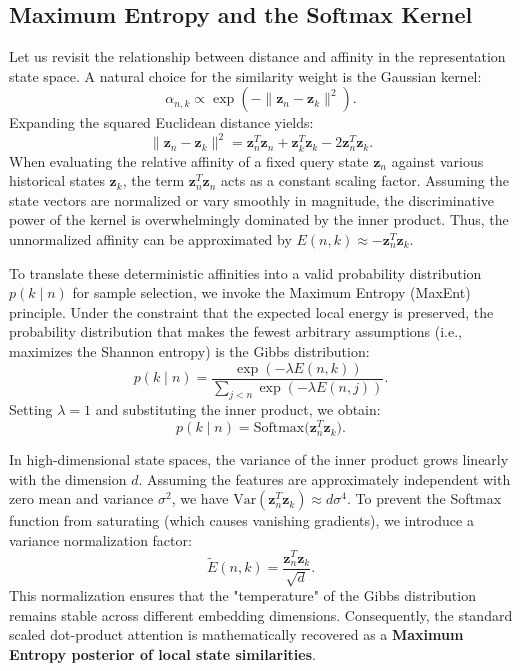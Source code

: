 \documentclass[conference]{IEEEtran}
\begin{document}
\subsection{Maximum Entropy and the Softmax Kernel}
Let us revisit the relationship between distance and affinity in the representation state space. A natural choice for the similarity weight is the Gaussian kernel:
\begin{equation}
\alpha_{n,k} \propto \exp(-\|\mathbf{z}_n - \mathbf{z}_k\|^2).
\end{equation}
Expanding the squared Euclidean distance yields:
\begin{equation}
\|\mathbf{z}_n - \mathbf{z}_k\|^2 = \mathbf{z}_n^T \mathbf{z}_n + \mathbf{z}_k^T \mathbf{z}_k - 2\mathbf{z}_n^T \mathbf{z}_k.
\end{equation}
When evaluating the relative affinity of a fixed query state $\mathbf{z}_n$ against various historical states $\mathbf{z}_k$, the term $\mathbf{z}_n^T \mathbf{z}_n$ acts as a constant scaling factor. Assuming the state vectors are normalized or vary smoothly in magnitude, the discriminative power of the kernel is overwhelmingly dominated by the inner product. Thus, the unnormalized affinity can be approximated by $E(n,k) \approx -\mathbf{z}_n^T \mathbf{z}_k$.

To translate these deterministic affinities into a valid probability distribution $p(k \mid n)$ for sample selection, we invoke the Maximum Entropy (MaxEnt) principle. Under the constraint that the expected local energy is preserved, the probability distribution that makes the fewest arbitrary assumptions (i.e., maximizes the Shannon entropy) is the Gibbs distribution:
\begin{equation}
p(k \mid n) = \frac{\exp(-\lambda E(n,k))}{\sum_{j<n}\exp(-\lambda E(n,j))}.
\end{equation}
Setting $\lambda = 1$ and substituting the inner product, we obtain:
\begin{equation}
p(k \mid n) = \text{Softmax}\big(\mathbf{z}_n^T \mathbf{z}_k\big).
\end{equation}

In high-dimensional state spaces, the variance of the inner product grows linearly with the dimension $d$. Assuming the features are approximately independent with zero mean and variance $\sigma^2$, we have $\mathrm{Var}(\mathbf{z}_n^T \mathbf{z}_k) \approx d\sigma^4$. To prevent the Softmax function from saturating (which causes vanishing gradients), we introduce a variance normalization factor:
\begin{equation}
\tilde{E}(n,k) = \frac{\mathbf{z}_n^T \mathbf{z}_k}{\sqrt{d}}.
\end{equation}
This normalization ensures that the "temperature" of the Gibbs distribution remains stable across different embedding dimensions. Consequently, the standard scaled dot-product attention \cite{vaswani2017attention} is mathematically recovered as a \textbf{Maximum Entropy posterior of local state similarities}.
\end{document}
